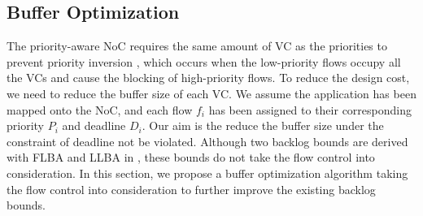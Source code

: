 \documentclass[10pt,journal]{IEEEtran}
\begin{document}
\subsection{Buffer Optimization}\label{bufferopt}
The priority-aware NoC requires the same amount of VC as the priorities to prevent priority inversion \cite{707545}, which occurs when the low-priority flows occupy all the VCs and cause the blocking of high-priority flows. To reduce the design cost, we need to reduce the buffer size of each VC. We assume the application has been mapped onto the NoC, and each flow $f_i$ has been assigned to their corresponding priority $P_i$ and deadline $D_i$. Our aim is the reduce the buffer size under the constraint of deadline not be violated. Although two backlog bounds are derived with FLBA and LLBA in \cite{189}, these bounds do not take the flow control into consideration. In this section, we propose a buffer optimization algorithm taking the flow control into consideration to further improve the existing backlog bounds.
\end{document}
